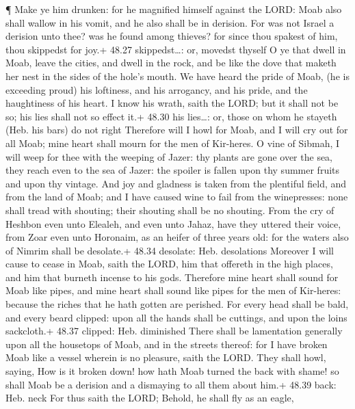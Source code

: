  ¶ Make ye him drunken: for he magnified himself against
the LORD: Moab also shall wallow in his vomit, and he also shall be in
derision.  For was not Israel a derision unto thee? was he
found among thieves? for since thou spakest of him, thou skippedst for
joy.+ 48.27 skippedst\ldots: or, movedst thyself  O ye that
dwell in Moab, leave the cities, and dwell in the rock, and be like the
dove that maketh her nest in the sides of the hole's mouth.
 We have heard the pride of Moab, (he is exceeding proud)
his loftiness, and his arrogancy, and his pride, and the haughtiness of
his heart.  I know his wrath, saith the LORD; but it shall
not be so; his lies shall not so effect it.+ 48.30 his lies\ldots: or,
those on whom he stayeth (Heb. his bars) do not right 
Therefore will I howl for Moab, and I will cry out for all Moab; mine
heart shall mourn for the men of Kir-heres.  O vine of
Sibmah, I will weep for thee with the weeping of Jazer: thy plants are
gone over the sea, they reach even to the sea of Jazer: the spoiler is
fallen upon thy summer fruits and upon thy vintage.  And
joy and gladness is taken from the plentiful field, and from the land of
Moab; and I have caused wine to fail from the winepresses: none shall
tread with shouting; their shouting shall be no shouting. 
From the cry of Heshbon even unto Elealeh, and even unto Jahaz, have
they uttered their voice, from Zoar even unto Horonaim, as an heifer of
three years old: for the waters also of Nimrim shall be desolate.+ 48.34
desolate: Heb. desolations  Moreover I will cause to cease
in Moab, saith the LORD, him that offereth in the high places, and him
that burneth incense to his gods.  Therefore mine heart
shall sound for Moab like pipes, and mine heart shall sound like pipes
for the men of Kir-heres: because the riches that he hath gotten are
perished.  For every head shall be bald, and every beard
clipped: upon all the hands shall be cuttings, and upon the loins
sackcloth.+ 48.37 clipped: Heb. diminished  There shall be
lamentation generally upon all the housetops of Moab, and in the streets
thereof: for I have broken Moab like a vessel wherein is no pleasure,
saith the LORD.  They shall howl, saying, How is it broken
down! how hath Moab turned the back with shame! so shall Moab be a
derision and a dismaying to all them about him.+ 48.39 back: Heb. neck
 For thus saith the LORD; Behold, he shall fly as an eagle,
